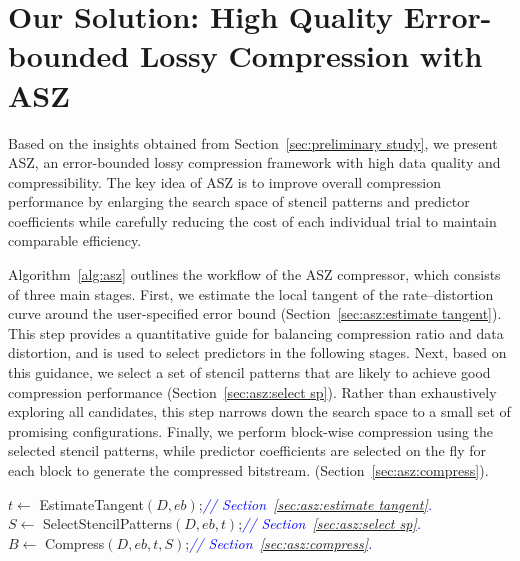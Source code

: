 \section{Our Solution: High Quality Error-bounded Lossy Compression with ASZ}\label{sec:asz}

Based on the insights obtained from Section~\ref{sec:preliminary study}, we present ASZ, an error-bounded lossy compression framework with high data quality and compressibility.
The key idea of ASZ is to improve overall compression performance by enlarging the search space of stencil patterns and predictor coefficients while carefully reducing the cost of each individual trial to maintain comparable efficiency.


Algorithm~\ref{alg:asz} outlines the workflow of the ASZ compressor, which consists of three main stages.
First, we estimate the local tangent of the rate–distortion curve around the user-specified error bound (Section~\ref{sec:asz:estimate tangent}).
This step provides a quantitative guide for balancing compression ratio and data distortion, and is used to select predictors in the following stages.
Next, based on this guidance, we select a set of stencil patterns that are likely to achieve good compression performance (Section~\ref{sec:asz:select sp}).
Rather than exhaustively exploring all candidates, this step narrows down the search space to a small set of promising configurations.
Finally, we perform block-wise compression using the selected stencil patterns, while predictor coefficients are selected on the fly for each block to generate the compressed bitstream. (Section~\ref{sec:asz:compress}).

\begin{algorithm}[h]
\small
\caption{ASZ Compression Workflow}
\label{alg:asz}
$t \leftarrow$ EstimateTangent$(D,eb)$;\hfill\textcolor{blue}{\textit{// Section~\ref{sec:asz:estimate tangent}.}}\\
$S \leftarrow$ SelectStencilPatterns$(D,eb,t)$;\hfill\textcolor{blue}{\textit{// Section~\ref{sec:asz:select sp}.}}\\
$B \leftarrow$ Compress$(D,eb,t,S)$;\hfill\textcolor{blue}{\textit{// Section~\ref{sec:asz:compress}.}}\\
\;
\end{algorithm}

